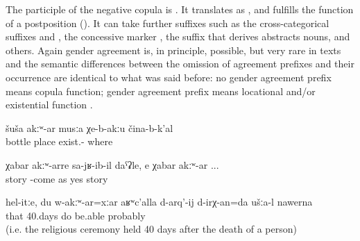 The participle of the negative copula is . It translates as  ,  and fulfills the function of a postposition (). It can take further suffixes such as the cross-categorical suffixes  and , the concessive marker  , the suffix  that derives abstracts nouns, and others. Again gender agreement is, in principle, possible, but very rare in texts  and the semantic differences between the omission of agreement prefixes and their occurrence are identical to what was said before: no gender agreement prefix means copula function; gender agreement prefix means locational and/or existential function .
%
\begin{exe}
	\ex	\label{ex:There is no place without bottles}
	\gll	šuša	akːʷ-ar	musːa	χe-b-akːu	čina-b-k'al\\
		bottle		place	exist.-	where\\
	\glt	{}

	\ex	\label{ex:as if his arrival was unexpected (lit. without news), yes unexpected}
	\gll	χabar	akːʷ-arre	sa-jʁ-ib-il	daˁʡle,		e	χabar	akːʷ-ar ...\\
		story		-come	as	yes	story	\\
	\glt	{}

	\ex	\label{ex:Well, you like this, even me not being there, should be able to do the 40 days, probably}
	\gll	hel-itːe,	du	w-akːʷ-ar=xːar	aʁʷc'alla	d-arq'-ij	d-irχ-an=da	ušːa-l		nawerna\\
		that			40.days	do	be.able			probably\\
	\glt	{} (i.e. the religious ceremony held 40 days after the death of a person)
\end{exe}

